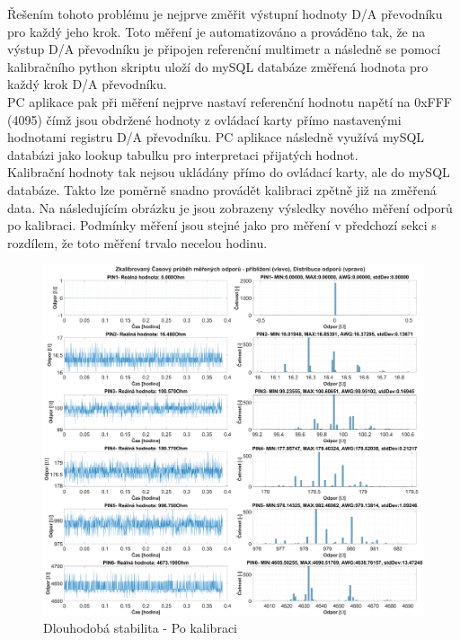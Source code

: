 Řešením tohoto problému je nejprve změřit výstupní hodnoty D/A převodníku pro každý jeho krok.
Toto měření je automatizováno a prováděno tak, že na výstup D/A převodníku je připojen referenční multimetr
a následně se pomocí kalibračního python skriptu uloží do mySQL databáze změřená hodnota pro každý krok D/A převodníku.\\

PC aplikace pak při měření nejprve nastaví referenční hodnotu napětí na 0xFFF (4095) čímž jsou obdržené hodnoty z ovládací karty
přímo nastavenými hodnotami registru D/A převodníku. PC aplikace následně využívá mySQL databázi jako lookup tabulku pro 
interpretaci přijatých hodnot. \\

Kalibrační hodnoty tak nejsou ukládány přímo do ovládací karty, ale do mySQL databáze. Takto lze poměrně snadno provádět kalibraci zpětně
již na změřená data. Na následujícím obrázku je jsou zobrazeny výsledky nového měření odporů po kalibraci.
Podmínky měření jsou stejné jako pro měření v předchozí sekci s rozdílem, že toto měření trvalo necelou hodinu.

\begin{figure}[ht!]
    \centering
    \includegraphics[width = 1\textwidth]{obrazky/matlab_generated/VOLTAGE_TESTER/calib_resistor_part1.eps}
    \caption{Dlouhodobá stabilita - Po kalibraci}
    \label{fig: 10hourTest calib Resistor PINS1TO6}
\end{figure}


